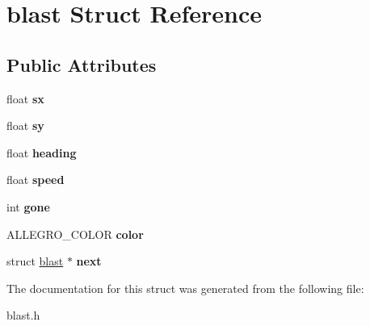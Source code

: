 \hypertarget{structblast}{}\section{blast Struct Reference}
\label{structblast}
\subsection*{Public Attributes}
\begin{DoxyCompactItemize}
\item 
\hypertarget{structblast_aca3fec4ee86356e0ff1cc935a8fff834}{}float {\bfseries sx}\label{structblast_aca3fec4ee86356e0ff1cc935a8fff834}

\item 
\hypertarget{structblast_a0ab88eac197627d7965644352c7e2aee}{}float {\bfseries sy}\label{structblast_a0ab88eac197627d7965644352c7e2aee}

\item 
\hypertarget{structblast_a0e4c27cd0d9054be96a6f414f4e8fd83}{}float {\bfseries heading}\label{structblast_a0e4c27cd0d9054be96a6f414f4e8fd83}

\item 
\hypertarget{structblast_ad54c020ede657eaec50093ac68d5f066}{}float {\bfseries speed}\label{structblast_ad54c020ede657eaec50093ac68d5f066}

\item 
\hypertarget{structblast_af07785bf0bd82e4fb4f1debbe89915cf}{}int {\bfseries gone}\label{structblast_af07785bf0bd82e4fb4f1debbe89915cf}

\item 
\hypertarget{structblast_a457fe1172a9517ec891667e6e4d8bf0f}{}A\+L\+L\+E\+G\+R\+O\+\_\+\+C\+O\+L\+O\+R {\bfseries color}\label{structblast_a457fe1172a9517ec891667e6e4d8bf0f}

\item 
\hypertarget{structblast_a9564b1dbc202daca78cd4dd89a2fa4f8}{}struct \hyperlink{structblast}{blast} $\ast$ {\bfseries next}\label{structblast_a9564b1dbc202daca78cd4dd89a2fa4f8}

\end{DoxyCompactItemize}


The documentation for this struct was generated from the following file\+:\begin{DoxyCompactItemize}
\item 
blast.\+h\end{DoxyCompactItemize}
